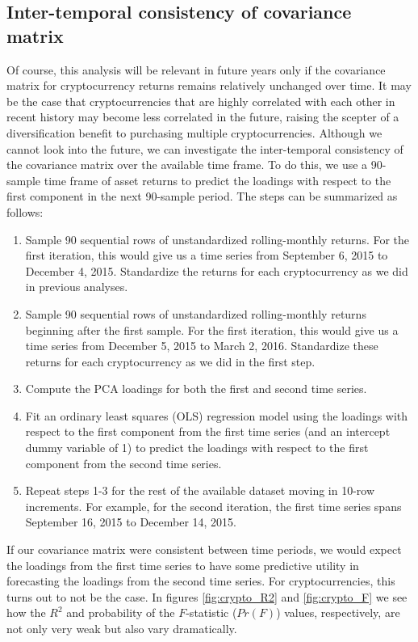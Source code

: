 \documentclass[12pt,twoside]{article}
\begin{document}
\subsection*{Inter-temporal consistency of covariance matrix}

Of course, this analysis will be relevant in future years only if the covariance matrix for cryptocurrency returns remains relatively unchanged over time. It may be the case that cryptocurrencies that are highly correlated with each other in recent history may become less correlated in the future, raising the scepter of a diversification benefit to purchasing multiple cryptocurrencies. Although we cannot look into the future, we can investigate the inter-temporal consistency of the covariance matrix over the available time frame. To do this, we use a 90-sample time frame of asset returns to predict the loadings with respect to the first component in the next 90-sample period. The steps can be summarized as follows:


\begin{enumerate}
	\item Sample 90 sequential rows of unstandardized rolling-monthly returns. For the first iteration, this would give us a time series from September 6, 2015 to December 4, 2015. Standardize the returns for each cryptocurrency as we did in previous analyses.
	\item Sample 90 sequential rows of unstandardized rolling-monthly returns beginning after the first sample. For the first iteration, this would give us a time series from December 5, 2015 to March 2, 2016. Standardize these returns for each cryptocurrency as we did in the first step.
	\item Compute the PCA loadings for both the first and second time series.
	\item Fit an ordinary least squares (OLS) regression model using the loadings with respect to the first component from the first time series (and an intercept dummy variable of 1) to predict the loadings with respect to the first component from the second time series.
	\item Repeat steps 1-3 for the rest of the available dataset moving in 10-row increments. For example, for the second iteration, the first time series spans September 16, 2015 to December 14, 2015.
\end{enumerate}

If our covariance matrix were consistent between time periods, we would expect the loadings from the first time series to have some predictive utility in forecasting the loadings from the second time series. For cryptocurrencies, this turns out to not be the case. In figures \ref{fig:crypto_R2} and \ref{fig:crypto_F} we see how the $R^2$ and probability of the $F$-statistic ($Pr(F)$) values, respectively, are not only very weak but also vary dramatically.
\end{document}
